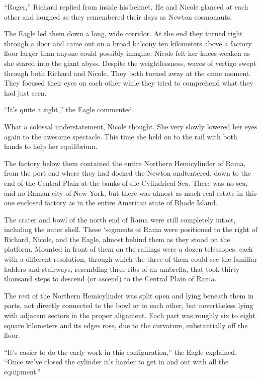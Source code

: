 \documentclass[]{article}
\begin{document}
{“Roger,” Richard replied from inside his’helmet.  He and Nicole glanced at each other and laughed as they remembered their days as Newton cosmonauts.

The Eagle led them down a long, wide corridor.  At the end they turned right through a door and came out on a broad balcony ten kilometers above a factory floor larger than anyone could possibly imagine.  Nicole felt her knees weaken as she stared into the giant abyss.  Despite the weightlessness, waves of vertigo swept through both Richard and Nicole.  They both turned away at the same moment.  They focused their eyes on each other while they tried to comprehend what they had just seen.

“It’s quite a sight,” the Eagle commented.

What a colossal understatement, Nicole thought.  She very slowly lowered her eyes again to the awesome spectacle.  This time she held on to the rail with both hands to help her equilibrium.

The factory below them contained the entire Northern Hemicylinder of Rama, from the port end where they had docked the Newton andtentered, down to the end of the Central Plain at the banks of die Cylindrical Sea.  There was no sea, and no Raman city of New York, but there was almost as much real estate in this one enclosed factory as in the entire American state of Rhode Island.

The crater and bowl of the north end of Rama were still completely intact, including the outer shell.  These ‘segments of Rama were positioned to the right of Richard, Nicole, and the Eagle, almost behind them as they stood on the platform.  Mounted in front of them on the railings were a dozen telescopes, each with a different resolution, through which the three of them could see the familiar ladders and stairways, resembling three ribs of an umbrella, that took thirty thousand steps to descend (or ascend) to the Central Plain of Rama.

The rest of the Northern Hemicylinder was split open and lying beneath them in parts, not directly connected to the bowl or to each other, but nevertheless lying with adjacent sectors in the proper alignment.  Each part was roughly six to eight square kilometers and its edges rose, due to the curvature, substantially off the floor.

“It’s easier to do the early work in this configuration,” the Eagle explained.  “Once we’ve closed the cylinder it’s harder to get in and out with all the equipment.”

}
\end{document}
